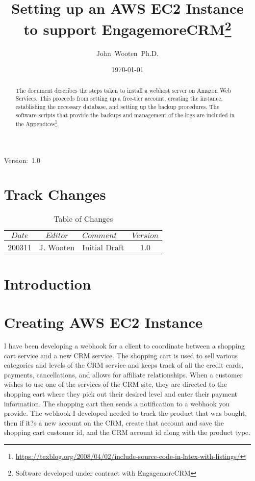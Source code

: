 \documentclass[final,letterpaper,12pt]{article}
\author{John~Wooten~Ph.D.\\
}
\date{\today \\
}
\title{Setting up an AWS EC2 Instance to support EngagemoreCRM\thanks{Software developed under contract with EngagemoreCRM}}
\begin{document}
\maketitle
\begin{center}
Version:~1.0
\end{center}

\begin {abstract}
\noindent  The document describes the steps taken to install a webhost server on Amazon Web Services.  This proceeds from setting up a free-tier account, creating the instance, establishing the necessary database, and setting up the backup procedures.  The software scripts that provide the backups and management of the logs are included in the Appendices\footnote{\url{https://texblog.org/2008/04/02/include-source-code-in-latex-with-listings/}}.
\end{abstract}
\newpage
\tableofcontents
\newpage
\listoffigures
\listoftables

\newpage
\section{Track Changes}
\begin{table}[h]
\begin{center}
\begin{tabular}{|c|c|l|c|} \hline
$ Date $ & $Editor$ & $Comment$ & $Version$ \\
\hline
200311  & J. Wooten & Initial Draft & 1.0  \\

\hline
\end{tabular}
\end{center}
\caption {Table of Changes}
\label{tab:cqdata0}
\end{table}

\newpage
\section{Introduction}


\section{Creating AWS EC2 Instance}
\noindent
I have been developing a webhook for a client to coordinate between a shopping cart service and a new CRM service. The shopping cart is used to sell various categories and levels of the CRM service and keeps track of all the credit cards, payments, cancellations, and allows for affiliate relationships. When a customer wishes to use one of the services of the CRM site, they are directed to the shopping cart where they pick out their desired level and enter their payment information. The shopping cart then sends a notification to a webhook you provide. The webhook I developed needed to track the product that was bought, then if it?s a new account on the CRM, create that account and save the shopping cart customer id, and the CRM account id along with the product type.
\end{document}

